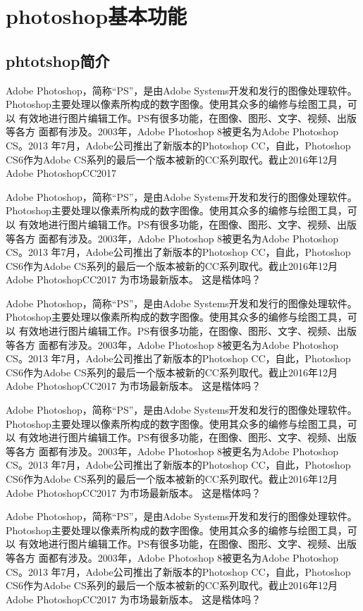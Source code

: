 
\mylineskip
\chapter{photoshop基本功能}
\section{phtotshop简介}
Adobe Photoshop，简称“PS”，是由Adobe Systems开发和发行的图像处理软件。
Photoshop主要处理以像素所构成的数字图像。使用其众多的编修与绘图工具，可以
有效地进行图片编辑工作。PS有很多功能，在图像、图形、文字、视频、出版等各方
面都有涉及。2003年，Adobe Photoshop 8被更名为Adobe Photoshop CS。2013
年7月，Adobe公司推出了新版本的Photoshop CC，自此，Photoshop CS6作为Adobe
 CS系列的最后一个版本被新的CC系列取代。截止2016年12月Adobe PhotoshopCC2017
 
 
 Adobe Photoshop，简称“PS”，是由Adobe Systems开发和发行的图像处理软件。
 Photoshop主要处理以像素所构成的数字图像。使用其众多的编修与绘图工具，可以
 有效地进行图片编辑工作。PS有很多功能，在图像、图形、文字、视频、出版等各方
 面都有涉及。2003年，Adobe Photoshop 8被更名为Adobe Photoshop CS。2013
 年7月，Adobe公司推出了新版本的Photoshop CC，自此，Photoshop CS6作为Adobe
 CS系列的最后一个版本被新的CC系列取代。截止2016年12月Adobe PhotoshopCC2017
 为市场最新版本。
 {\kaishu 这是楷体吗？}
 
  Adobe Photoshop，简称“PS”，是由Adobe Systems开发和发行的图像处理软件。
 Photoshop主要处理以像素所构成的数字图像。使用其众多的编修与绘图工具，可以
 有效地进行图片编辑工作。PS有很多功能，在图像、图形、文字、视频、出版等各方
 面都有涉及。2003年，Adobe Photoshop 8被更名为Adobe Photoshop CS。2013
 年7月，Adobe公司推出了新版本的Photoshop CC，自此，Photoshop CS6作为Adobe
 CS系列的最后一个版本被新的CC系列取代。截止2016年12月Adobe PhotoshopCC2017
 为市场最新版本。
 {\kaishu 这是楷体吗？}
 
  Adobe Photoshop，简称“PS”，是由Adobe Systems开发和发行的图像处理软件。
 Photoshop主要处理以像素所构成的数字图像。使用其众多的编修与绘图工具，可以
 有效地进行图片编辑工作。PS有很多功能，在图像、图形、文字、视频、出版等各方
 面都有涉及。2003年，Adobe Photoshop 8被更名为Adobe Photoshop CS。2013
 年7月，Adobe公司推出了新版本的Photoshop CC，自此，Photoshop CS6作为Adobe
 CS系列的最后一个版本被新的CC系列取代。截止2016年12月Adobe PhotoshopCC2017
 为市场最新版本。
 {\kaishu 这是楷体吗？}
 
  Adobe Photoshop，简称“PS”，是由Adobe Systems开发和发行的图像处理软件。
 Photoshop主要处理以像素所构成的数字图像。使用其众多的编修与绘图工具，可以
 有效地进行图片编辑工作。PS有很多功能，在图像、图形、文字、视频、出版等各方
 面都有涉及。2003年，Adobe Photoshop 8被更名为Adobe Photoshop CS。2013
 年7月，Adobe公司推出了新版本的Photoshop CC，自此，Photoshop CS6作为Adobe
 CS系列的最后一个版本被新的CC系列取代。截止2016年12月Adobe PhotoshopCC2017
 为市场最新版本。
 {\kaishu 这是楷体吗？}
 
